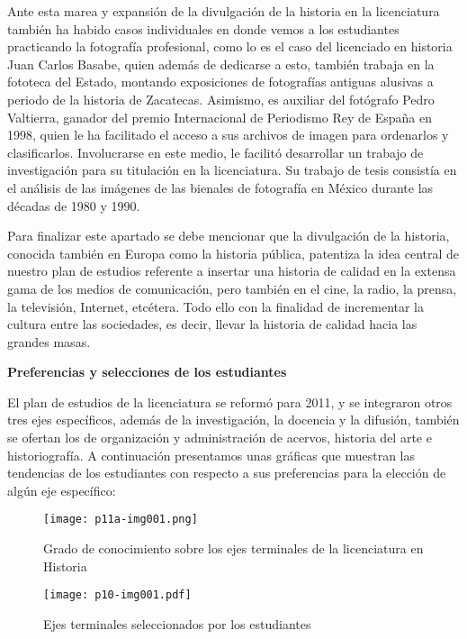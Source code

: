 Ante esta marea y expansión de la divulgación de la historia en la licenciatura
también ha habido casos individuales en donde vemos a los estudiantes
practicando la fotografía profesional, como lo es el caso del licenciado en
historia Juan Carlos Basabe, quien además de dedicarse a esto, también trabaja
en la fototeca del Estado, montando exposiciones de fotografías antiguas
alusivas a periodo de la historia de Zacatecas. Asimismo, es auxiliar del
fotógrafo Pedro Valtierra, ganador del premio Internacional de Periodismo Rey de
España en 1998, quien le ha facilitado el acceso a sus archivos de imagen para
ordenarlos y clasificarlos. Involucrarse en este medio, le facilitó desarrollar
un trabajo de investigación para su titulación en la licenciatura. Su trabajo
de tesis consistía en el análisis de las imágenes de las bienales de fotografía
en México durante las décadas de 1980 y 1990.

Para finalizar este apartado se debe mencionar que la divulgación de la historia,
conocida también en Europa como la historia pública, patentiza la idea central
de nuestro plan de estudios referente a insertar una historia de calidad en la
extensa gama de los medios de comunicación, pero también en el cine, la radio,
la prensa, la televisión, Internet, etcétera. Todo ello con la finalidad de
incrementar la cultura entre las sociedades, es decir, llevar la historia de
calidad hacia las grandes masas. 

\bigskip
\textbf{Preferencias y selecciones de los estudiantes}

El plan de estudios de la licenciatura se reformó para 2011, y se integraron
otros tres ejes específicos, además de la investigación, la docencia y la difusión,
también se ofertan los de organización y administración de acervos, historia
del arte e historiografía. A continuación presentamos unas gráficas que
muestran las tendencias de los estudiantes con respecto a sus preferencias para
la elección de algún eje específico:

\begin{figure}[H]
\centering
\texttt{[image: p11a-img001.png]}
\caption{Grado de conocimiento sobre los ejes terminales de la licenciatura en Historia}
\end{figure}


\bigskip
\begin{figure}[H]
\centering
\texttt{[image: p10-img001.pdf]} 
\caption{Ejes terminales seleccionados por los estudiantes}
\end{figure}


